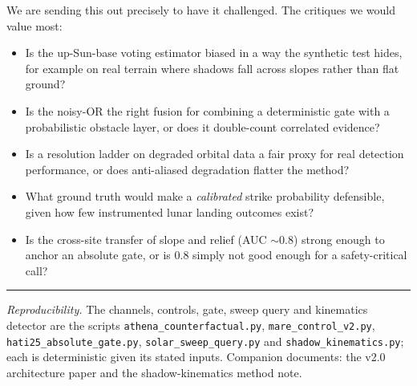 \documentclass[11pt]{article}
\begin{document}
We are sending this out precisely to have it challenged. The critiques we would value most:
\begin{itemize}
\item Is the up-Sun-base voting estimator biased in a way the synthetic test hides, for
example on real terrain where shadows fall across slopes rather than flat ground?
\item Is the noisy-OR the right fusion for combining a deterministic gate with a probabilistic
obstacle layer, or does it double-count correlated evidence?
\item Is a resolution ladder on degraded orbital data a fair proxy for real detection
performance, or does anti-aliased degradation flatter the method?
\item What ground truth would make a \emph{calibrated} strike probability defensible, given how
few instrumented lunar landing outcomes exist?
\item Is the cross-site transfer of slope and relief (AUC $\sim0.8$) strong enough to anchor an
absolute gate, or is \num{0.8} simply not good enough for a safety-critical call?
\end{itemize}

\medskip\hrule\medskip
\noindent\footnotesize\textit{Reproducibility.} The channels, controls, gate, sweep query and
kinematics detector are the scripts \texttt{athena\_counterfactual.py},
\texttt{mare\_control\_v2.py}, \texttt{hati25\_absolute\_gate.py}, \texttt{solar\_sweep\_query.py}
and \texttt{shadow\_kinematics.py}; each is deterministic given its stated inputs. Companion
documents: the v2.0 architecture paper and the shadow-kinematics method note.

\printbibliography
\end{document}

